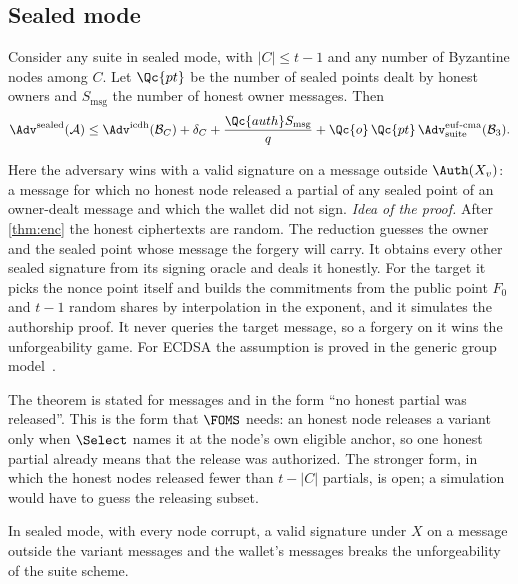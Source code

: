 \subsection{Sealed mode}

\begin{theorem}\label{thm:sealed}
Consider any suite in sealed mode, with $|C| \le t-1$ and any number of Byzantine nodes among $C$. Let $\Qc{pt}$ be the number of sealed points dealt by honest owners and $S_{\mathrm{msg}}$ the number of honest owner messages. Then
\[
  \Adv^{\mathrm{sealed}}(\mathcal{A}) \le \Adv^{\mathrm{icdh}}(\mathcal{B}_C) + \delta_C + \frac{\Qc{auth} S_{\mathrm{msg}}}{q} + \Qc{o}\,\Qc{pt}\,\Adv^{\mathrm{euf\text{-}cma}}_{\mathrm{suite}}(\mathcal{B}_3).
\]
\end{theorem}

Here the adversary wins with a valid signature on a message outside $\Auth(X_v)$: a message for which no honest node released a partial of any sealed point of an owner-dealt message and which the wallet did not sign. \emph{Idea of the proof.} After \cref{thm:enc} the honest ciphertexts are random. The reduction guesses the owner and the sealed point whose message the forgery will carry. It obtains every other sealed signature from its signing oracle and deals it honestly. For the target it picks the nonce point itself and builds the commitments from the public point $F_0$ and $t-1$ random shares by interpolation in the exponent, and it simulates the authorship proof. It never queries the target message, so a forgery on it wins the unforgeability game. For ECDSA the assumption is proved in the generic group model~\cite[Theorem~1]{GS21}.

The theorem is stated for messages and in the form ``no honest partial was released''. This is the form that $\FOMS$ needs: an honest node releases a variant only when $\Select$ names it at the node's own eligible anchor, so one honest partial already means that the release was authorized. The stronger form, in which the honest nodes released fewer than $t - |C|$ partials, is open; a simulation would have to guess the releasing subset.

\begin{corollary}\label{cor:corrupt}
In sealed mode, with every node corrupt, a valid signature under $X$ on a message outside the variant messages and the wallet's messages breaks the unforgeability of the suite scheme.
\end{corollary}

